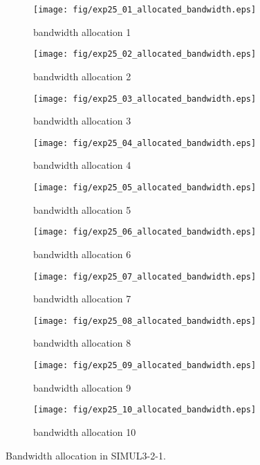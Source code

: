 	\begin{figure}
		\begin{center}
			\begin{subfigure}[b]{0.32\textwidth}
				\texttt{[image: fig/exp25\_01\_allocated\_bandwidth.eps]}
				\caption{bandwidth allocation 1}
				\label{figure:simul3_2_1_b_a}
			\end{subfigure}
			\begin{subfigure}[b]{0.32\textwidth}
				\texttt{[image: fig/exp25\_02\_allocated\_bandwidth.eps]}
				\caption{bandwidth allocation 2}
				\label{figure:simul3_2_1_b_b}
			\end{subfigure}
			\begin{subfigure}[b]{0.32\textwidth}
				\texttt{[image: fig/exp25\_03\_allocated\_bandwidth.eps]}
				\caption{bandwidth allocation 3}
				\label{figure:simul3_2_1_b_c}
			\end{subfigure}
			\begin{subfigure}[b]{0.32\textwidth}
				\texttt{[image: fig/exp25\_04\_allocated\_bandwidth.eps]}
				\caption{bandwidth allocation 4}
				\label{figure:simul3_2_1_b_d}
			\end{subfigure}
			\begin{subfigure}[b]{0.32\textwidth}
				\texttt{[image: fig/exp25\_05\_allocated\_bandwidth.eps]}
				\caption{bandwidth allocation 5}
				\label{figure:simul3_2_1_b_e}
			\end{subfigure}
			\begin{subfigure}[b]{0.32\textwidth}
				\texttt{[image: fig/exp25\_06\_allocated\_bandwidth.eps]}
				\caption{bandwidth allocation 6}
				\label{figure:simul3_2_1_b_f}
			\end{subfigure}
			\begin{subfigure}[b]{0.32\textwidth}
				\texttt{[image: fig/exp25\_07\_allocated\_bandwidth.eps]}
				\caption{bandwidth allocation 7}
				\label{figure:simul3_2_1_b_g}
			\end{subfigure}
			\begin{subfigure}[b]{0.32\textwidth}
				\texttt{[image: fig/exp25\_08\_allocated\_bandwidth.eps]}
				\caption{bandwidth allocation 8}
				\label{figure:simul3_2_1_b_h}
			\end{subfigure}
			\begin{subfigure}[b]{0.32\textwidth}
				\texttt{[image: fig/exp25\_09\_allocated\_bandwidth.eps]}
				\caption{bandwidth allocation 9}
				\label{figure:simul3_2_1_b_i}
			\end{subfigure}
			\begin{subfigure}[b]{0.32\textwidth}
				\texttt{[image: fig/exp25\_10\_allocated\_bandwidth.eps]}
				\caption{bandwidth allocation 10}
				\label{figure:simul3_2_1_b_j}
			\end{subfigure}
			\caption{Bandwidth allocation in SIMUL3-2-1.}
			\label{figure:simul3_2_1_ba}
		\end{center}
	\end{figure}


